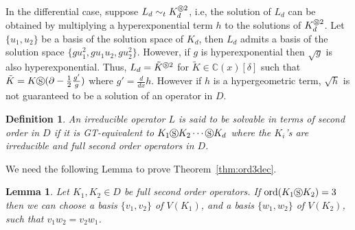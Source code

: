 \documentclass{article}
\newtheorem{lemma}[theorem]{Lemma}
\newtheorem{definition}[theorem]{Definition}
\newcommand{\C}{{\mathbb{C}}} \newcommand{\N}{{\mathbb{N}}}
\newcommand{\ord}{\mathrm{ord}}
\newcommand{\cS}{\circledS}
\begin{document}
In the differential case, suppose $L_d \sim_t K_d^{\cS 2}$, i.e, the
  solution of $L_d$ can be obtained by multiplying a hyperexponential term $h$ to the
  solutions of $K_d^{\cS 2}$. Let $\{ u_1, u_2\}$ be a basis of the solution space of
  $K_d$, then $L_d$ admits a basis of the solution space $\{ gu_1^2, gu_1u_2, gu_2^2\}$.
  However, if $g$ is hyperexponential then $\sqrt{g}$ is also hyperexponential. Thus,
  $L_d=\tilde{K}^{\cS 2}$ for $\tilde{K} \in \C(x)[\delta]$ such that $\tilde{K}=K \cS
  (\partial-\frac12 \frac{g'}{g})$ where $g'=\frac{d}{dx} h$.  However if $h$ is a
  hypergeometric term, $\sqrt{h}$ is not guaranteed to be a solution of an operator in $D$.




\begin{definition}\label{def:gauge-equ}
  An irreducible operator $L$ is said to be {\emph solvable in terms of second order in $D$} if it is
  GT-equivalent to $K_1 \circledS K_2 \cdots \circledS K_d$ where the $K_i$'s
  are irreducible and full second order operators in $D$.
\end{definition}

We need the following Lemma to prove Theorem~\ref{thm:ord3dec}.  


\begin{lemma}\label{symbs}
  Let $K_1, K_2 \in D$ be full second order operators. 
If $\ord(K_1 \cS K_2)=3$ then 
we can choose a basis $\{ v_1, v_2 \}$ of $V(K_1)$, and a basis $\{
  w_1, w_2 \}$ of $V(K_2)$, such that $v_1w_2=v_2 w_1$.

\end{lemma}
\end{document}
